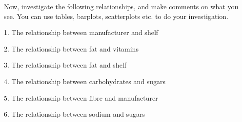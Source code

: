\documentclass[a4paper,12pt]{article}
\begin{document}
 

Now, investigate the following relationships, and make comments on what you see. You can use tables, barplots, scatterplots etc. to do your investigation.

 

1. The relationship between manufacturer and shelf

2. The relationship between fat and vitamins

3. The relationship between fat and shelf

4. The relationship between carbohydrates and sugars

5. The relationship between fibre and manufacturer

6. The relationship between sodium and sugars

 
\end{document}
